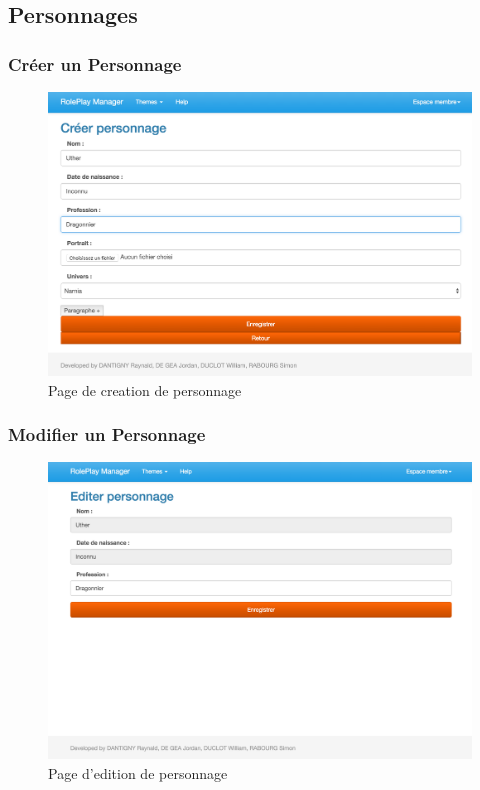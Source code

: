 \documentclass[a4paper,oneside,10pt]{article}
\begin{document}
\subsection{Personnages}

\subsubsection{Créer un Personnage}
\label{MUCreerPersonnage}

\begin{figure}[H]
	\begin{center}
		\includegraphics[width=\textwidth]{images/manuel/creerpersonnage.png}  
		\caption{Page de creation de personnage}
	\end{center}
\end{figure}

\subsubsection{Modifier un Personnage}
\label{MUModifierPersonnage}

\begin{figure}[H]
	\begin{center}
		\includegraphics[width=\textwidth]{images/manuel/editerpersonnage.png}  
		\caption{Page d'edition de personnage}
	\end{center}
\end{figure}
\end{document}

